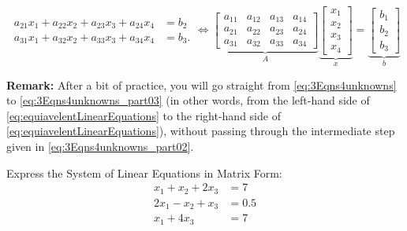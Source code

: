 \begin{tcolorbox}[sharp corners, colback=green!30, colframe=green!80!blue, title={\bf \Large From Multiple Linear Equations to Matrices and Vectors}]
\begin{equation}
\begin{aligned}
a_{21} x_1+ a_{22}x_2 + a_{23}x_3 + a_{24}x_4&=b_2 \\
a_{31} x_1+ a_{32}x_2 + a_{33}x_3 + a_{34}x_4&=b_3.
\end{aligned} \iff 
\underbrace{  \left[ \begin{array}{cccc}
a_{11} & a_{12} &  a_{13} & a_{14} \\
a_{21} & a_{22} &   a_{23} & a_{24} \\
a_{31}& a_{32}& a_{33} & a_{34}
\end{array} \right] }_{A} \underbrace{\begin{bmatrix}x_1 \\x_2 \\ x_3 \\ x_4 \end{bmatrix}}_{x} = \underbrace{\begin{bmatrix} b_1 \\ b_2 \\b_3 \end{bmatrix}}_{b}
\end{equation}

\textbf{Remark:} After a bit of practice, you will go straight from \eqref{eq:3Eqns4unknowns} to \eqref{eq:3Eqns4unknowns_part03} (in other words, from the left-hand side of \eqref{eq:equiavelentLinearEquations} to the right-hand side of \eqref{eq:equiavelentLinearEquations}), without passing through the intermediate step given in  \eqref{eq:3Eqns4unknowns_part02}. 

\end{tcolorbox}

\begin{example}
\label{ex:ExpressMatrixForm03}
Express the System of Linear Equations in Matrix Form: 
\begin{equation}
\begin{aligned}
x_1+x_2+2x_3 &=7 \\
2x_1-x_2+x_3&=0.5\\
x_1 + 4 x_3 &=7
\end{aligned}
\end{equation}
\end{example}

